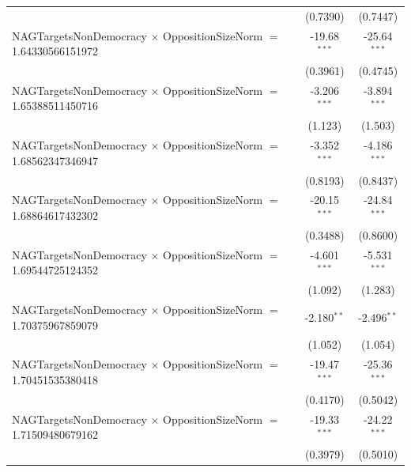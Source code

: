 \begin{tabular}{lcc}
                                                                                & (0.7390)             & (0.7447)\\   
   NAGTargetsNonDemocracy $\times$ OppositionSizeNorm $=$ 1.64330566151972      & -19.68$^{***}$       & -25.64$^{***}$\\   
                                                                                & (0.3961)             & (0.4745)\\   
   NAGTargetsNonDemocracy $\times$ OppositionSizeNorm $=$ 1.65388511450716      & -3.206$^{***}$       & -3.894$^{***}$\\   
                                                                                & (1.123)              & (1.503)\\   
   NAGTargetsNonDemocracy $\times$ OppositionSizeNorm $=$ 1.68562347346947      & -3.352$^{***}$       & -4.186$^{***}$\\   
                                                                                & (0.8193)             & (0.8437)\\   
   NAGTargetsNonDemocracy $\times$ OppositionSizeNorm $=$ 1.68864617432302      & -20.15$^{***}$       & -24.84$^{***}$\\   
                                                                                & (0.3488)             & (0.8600)\\   
   NAGTargetsNonDemocracy $\times$ OppositionSizeNorm $=$ 1.69544725124352      & -4.601$^{***}$       & -5.531$^{***}$\\   
                                                                                & (1.092)              & (1.283)\\   
   NAGTargetsNonDemocracy $\times$ OppositionSizeNorm $=$ 1.70375967859079      & -2.180$^{**}$        & -2.496$^{**}$\\   
                                                                                & (1.052)              & (1.054)\\   
   NAGTargetsNonDemocracy $\times$ OppositionSizeNorm $=$ 1.70451535380418      & -19.47$^{***}$       & -25.36$^{***}$\\   
                                                                                & (0.4170)             & (0.5042)\\   
   NAGTargetsNonDemocracy $\times$ OppositionSizeNorm $=$ 1.71509480679162      & -19.33$^{***}$       & -24.22$^{***}$\\   
                                                                                & (0.3979)             & (0.5010)\\   

\end{tabular}
